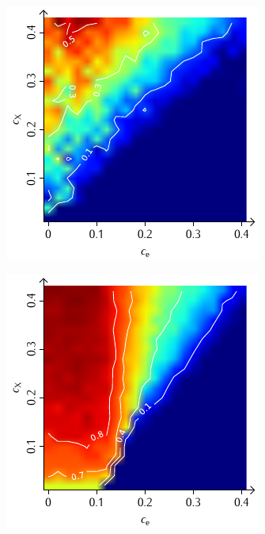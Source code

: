 \documentclass[a4paper, 10pt, twoside, openany]{book} %
\begin{document}
\begin{figure}
\begin{minipage}[t]{0.48\textwidth}
			\label{H_random_K}
		\end{minipage}
		\hfill
		\begin{minipage}[t]{0.48\textwidth}
			\includegraphics[width=\textwidth]{Abbildungen/Phasendiagramme/Konturen/H_penalty_random_K.pdf}
			\label{H_penalty_random_K}
		\end{minipage}
		\begin{minipage}[t]{0.48\textwidth}
			\includegraphics[width=\textwidth]{Abbildungen/Phasendiagramme/Konturen/H_individual_K.pdf}

\end{minipage}
\end{figure}
\end{document}
